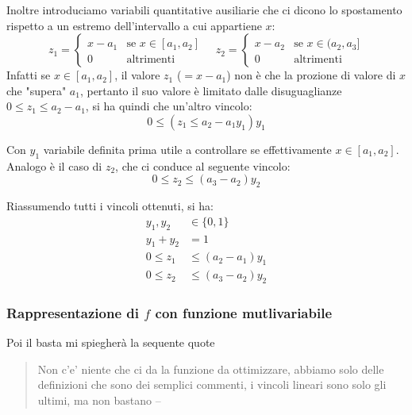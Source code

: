 Inoltre introduciamo variabili quantitative ausiliarie che ci dicono lo spostamento rispetto a un estremo dell'intervallo a cui appartiene $x$:
\begin{equation}
  z_1 = \begin{cases}
    x - a_1 & \text{se } x \in [a_1, a_2]\\
    0 & \text{altrimenti}
  \end{cases} \quad z_2 = \begin{cases}
    x - a_2 & \text{se } x \in (a_2, a_3]\\
    0 & \text{altrimenti}
  \end{cases}
\end{equation}
Infatti se $x\in[a_1, a_2]$, il valore $z_1$ ($=x-a_1$) non è che la prozione di valore di $x$ che "supera" $a_1$, pertanto il suo valore è limitato dalle disuguaglianze $0\leq z_1 \leq a_2 - a_1$, si ha quindi che un'altro vincolo:
\[
  0\leq  (z_1 \leq a_2 - a_1 y_1)y_1
\]

Con $y_1$ variabile definita prima utile a controllare se effettivamente $x\in [a_1,a_2]$. Analogo è il caso di $z_2$, che ci conduce al seguente vincolo:
\[
  0\leq z_2 \leq (a_3 - a_2 )y_2
\]

Riassumendo tutti i vincoli ottenuti, si ha:
\begin{equation}
  \label{eq:vincoli_tratti}
  \begin{aligned}
    y_1,y_2 &\in \{0,1\}\\
    y_1 + y_2 &= 1\\
    0\leq z_1 &\leq (a_2 - a_1)y_1\\
    0\leq z_2 &\leq (a_3 - a_2)y_2
  \end{aligned}
\end{equation} 


\subsubsection{Rappresentazione di $f$ con funzione mutlivariabile}
Poi il basta mi spiegherà la sequente quote 
\begin{quote}
  Non c'e' niente che ci da la funzione da ottimizzare, abbiamo solo delle definizioni che sono dei semplici commenti, i vincoli lineari sono solo gli ultimi, ma non bastano
  \hfill -- \faWhatsapp  
\end{quote}

